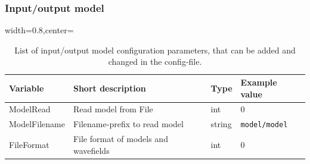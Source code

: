\documentclass[pdftex,a4paper,parskip,listof=totoc,bibliography=totoc,onehalfspacing,12pt]{scrreprt}
\newcommand{\shellcmd}[1]{\indent\indent\texttt{#1}}	%
\begin{document}
\subsubsection{Input/output model}
\begin{table}[h!]
\caption[List of input/output model configuration parameters.]{List of input/output model configuration parameters, that can be added and changed in the config-file.}\label{tab:config_inputoutput}
\centering
\begin{adjustbox}{width=0.8\textwidth,center=\textwidth}
	\begin{tabular}{llll}
	\toprule
	Variable & Short description & Type & Example value \\
	\midrule	 
	ModelRead& Read model from File  & int & \num{0}\\
	ModelFilename& Filename-prefix to read model & string & \shellcmd{model/model}\\
	FileFormat&  File format of models and wavefields & int & \num{0}\\
	\bottomrule
	\end{tabular}
	\end{adjustbox}
\end{table}
\begin{table}[h!]
\caption[]{List of equationType and the corresponding model parameters.}\label{tab:equationType_model}
\centering
{}
\end{table}
\end{document}
